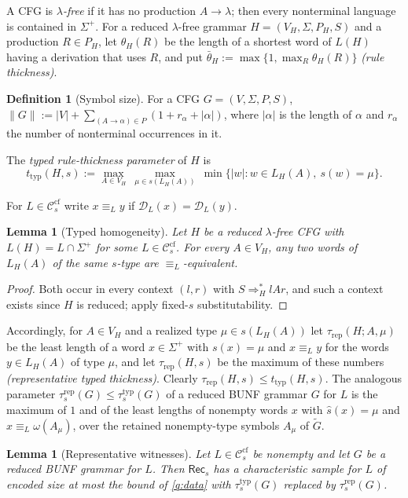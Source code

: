 \documentclass[11pt]{article}
\numberwithin{equation}{section}
\theoremstyle{plain}
\newtheorem{lemma}[theorem]{Lemma}
\theoremstyle{definition}
\newtheorem{definition}[theorem]{Definition}
\theoremstyle{remark}
\theoremstyle{plain}
\newcommand{\cf}{\mathrm{cf}}
\newcommand{\Ccf}[1]{\mathcal C_{#1}^{\cf}}
\newcommand{\Rec}{\mathsf{Rec}}
\newcommand{\D}{\mathcal{D}}
\newcommand{\ttyp}{t_{\mathrm{typ}}}
\newcommand{\trep}{\tau_{\mathrm{rep}}}
\begin{document}
A CFG is \emph{$\lambda$-free} if it has no production $A\to\lambda$; then every
nonterminal language is contained in $\Sigma^+$.  For a reduced $\lambda$-free grammar
$H=(V_H,\Sigma,P_H,S)$ and a production $R\in P_H$, let $\theta_H(R)$ be the
length of a shortest word of $L(H)$ having a derivation that uses $R$, and
put $\bar\theta_H:=\max\{1,\max_{R}\theta_H(R)\}$ \emph{(rule thickness)}.
\begin{definition}[Symbol size]
\label{def:symbol-size}
For a CFG $G=(V,\Sigma,P,S)$, $\|G\|:=|V|+\sum_{(A\to\alpha)\in P}(1+r_\alpha+|\alpha|)$,
where $|\alpha|$ is the length of $\alpha$ and $r_\alpha$ the number of
nonterminal occurrences in it.
\end{definition}

The \emph{typed rule-thickness parameter} of $H$ is
\[
 \ttyp(H,s):=\max_{A\in V_H}\ \max_{\mu\in s(L_H(A))}\
 \min\{|w|:w\in L_H(A),\ s(w)=\mu\}.
\]

For $L\in\Ccf{s}$ write $x\equiv_L y$ if $\D_L(x)=\D_L(y)$.

\begin{lemma}[Typed homogeneity]
\label{lem:homogeneity}
Let $H$ be a reduced $\lambda$-free CFG with $L(H)=L\cap\Sigma^+$ for some $L\in\Ccf{s}$.
For every $A\in V_H$, any two words of $L_H(A)$ of the same $s$-type are
$\equiv_L$-equivalent.
\end{lemma}

\begin{proof}
Both occur in every context $(l,r)$ with $S\Rightarrow_H^*lAr$, and such a context
exists since $H$ is reduced; apply fixed-$s$ substitutability.
\end{proof}

Accordingly, for $A\in V_H$ and a realized type $\mu\in s(L_H(A))$ let
$\trep(H;A,\mu)$ be the least length of a word $x\in\Sigma^+$ with $s(x)=\mu$
and $x\equiv_L y$ for the words $y\in L_H(A)$ of type $\mu$, and let
$\trep(H,s)$ be the maximum of these numbers \emph{(representative typed
thickness)}.  Clearly $\trep(H,s)\le\ttyp(H,s)$.  The analogous parameter
$\tau^{\mathrm{rep}}_s(G)\le\tau^{\mathrm{typ}}_s(G)$ of a reduced BUNF grammar
$G$ for $L$ is the maximum of $1$ and of the least lengths of nonempty words
$x$ with $\widehat s(x)=\mu$ and $x\equiv_L\omega(A_\mu)$, over the retained
nonempty-type symbols $A_\mu$ of $\widetilde G$.

\begin{lemma}[Representative witnesses]
\label{lem:rep-witness}
Let $L\in\Ccf{s}$ be nonempty and let $G$ be a reduced BUNF grammar for $L$.
Then $\Rec_s$ has a characteristic sample for $L$ of encoded size at most the
bound of \ref{q:data} with $\tau^{\mathrm{typ}}_s(G)$ replaced by
$\tau^{\mathrm{rep}}_s(G)$.
\end{lemma}
\end{document}

